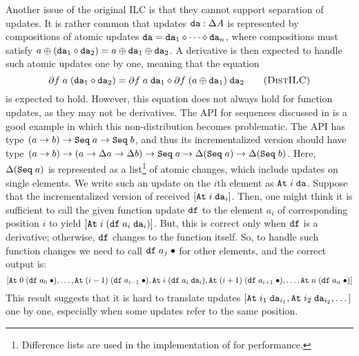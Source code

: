 \documentclass{article}
\theoremstyle{definition}
\begin{document}
Another issue of the original ILC is that they cannot support separation of updates. It is rather common that updates $\texttt{da} : \Delta A$
is represented by compositions of atomic updates $\var{da} = \var{da}_1 \ComposeU \dots \ComposeU \var{da}_n$, where compositions must satisfy 
$a \oplus (\texttt{da}_1 \mathbin{\diamond} \texttt{da}_2) = a \oplus \texttt{da}_1 \oplus \texttt{da}_2$.
A derivative is then expected to handle such atomic updates one by one, meaning that the equation 
\[
\partial f \A a \A (\var{da}_1 \ComposeU \var{da}_2) = \partial f \A a \A \var{da}_1 \ComposeU \partial f \A (a \oplus \var{da}_1) \A \var{da}_2 \tag{\textsc{DistILC}}\label{eq:dist-ilc}
\]
is expected to hold. However, this equation does not always hold for function updates, as they may not be derivatives. The  API for sequences discussed in 
\citet{GiarrussoRS19} is a good example in which this non-distribution becomes problematic. The API has type $(a \to b) \to \texttt{Seq} \; a \to \texttt{Seq} \; b$, 
and thus its incrementalized version should have type $(a \to b) \to (a \to \Delta a \to \Delta b) \to \texttt{Seq} \; a \to \Delta (\texttt{Seq} \; a) \to \Delta (\texttt{Seq} \; b)$. 
Here, $\Delta (\texttt{Seq} \; a)$ is represented as a list\footnote{Difference lists are used in the implementation of \citet{GiarrussoRS19} for performance.} of atomic changes, which include 
updates on single elements. We write such an update on the $i$th element as \(\texttt{At} \; i \; \texttt{da}\). 
Suppose that the incrementalized version of  received $[\texttt{At} \; i \; \texttt{da}_i]$. Then, one might think it is sufficient to call the given function update $\texttt{df}$ to the element $a_i$ of corresponding position $i$ to yield $[\texttt{At} \; i \; (\texttt{df} \; a_i \; \texttt{da}_i)]$. But, this is correct only when $\texttt{df}$ is a derivative; otherwise, $\texttt{df}$ changes to the function itself. 
So, to handle such function changes we need to call $\texttt{df} \; a_j \; {\bullet}$ for other elements, and the correct output is: 
\[
[ \texttt{At} \; 0 \; (\texttt{df} \; a_0 \; {\bullet}), \dots, \texttt{At} \; (i-1) \; (\texttt{df} \; a_{i-1} \; {\bullet}), \texttt{At} \; i \; (\texttt{df} \; a_i \; \texttt{da}_i), \texttt{At} \; (i+1) \; (\texttt{df} \; a_{i+1} \; {\bullet}), \dots, \texttt{At} \; n \; (\texttt{df} \; a_n \; {\bullet}) ]
\]
This result suggests that it is hard to translate updates $[\texttt{At} \; {i_1} \; \texttt{da}_{i_1}, \texttt{At} \; {i_2} \; \texttt{da}_{i_2},\dots]$ one by one, especially when some updates refer to the same position. 
\end{document}
